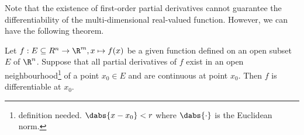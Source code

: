 Note that the existence of first-order partial derivatives cannot guarantee the differentiability of the multi-dimensional real-valued function. However, we can have the following theorem.%

\begin{theorem}\label{thm:continuous_partial_derivatives_implies_real_differentiability}
Let $f:E\subseteq R^n\to \R^m,x\mapsto f(x)$ be a given function defined on an open subset $E$ of $\R^n$. Suppose that all partial derivatives of $f$ exist in an open neighbourhood\footnote{definition needed. $\dabs{x-x_0}<r$ where $\dabs{\cdot}$ is the Euclidean norm.} of a point $x_0\in E$ and are continuous at point $x_0$. Then $f$ is differentiable at $x_0$.
\end{theorem}

